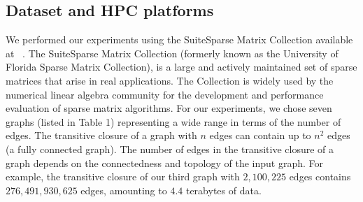 \subsection{Dataset and HPC platforms}
\label{sec:datasets}
We performed our experiments using the SuiteSparse Matrix Collection available at ~\cite{Davis:2011:UFS:2049662.2049663}.
The SuiteSparse Matrix Collection (formerly known as the University of Florida Sparse Matrix Collection), is a large and actively maintained set of sparse matrices that arise in real applications. The Collection is widely used by the numerical linear algebra community for the development and performance evaluation of sparse matrix algorithms. 
For our experiments, we chose seven graphs (listed in Table 1) representing a wide range in terms of the number of edges.
The transitive closure of a graph with $n$ edges can contain up to $n^2$ edges (a fully connected graph). The number of edges in the transitive closure of a graph depends on the connectedness and topology of the input graph. For example, the transitive closure of our third graph with $2,\!100,\!225$ edges contains $276,\!491,\!930,\!625$ edges, amounting to $4.4$ terabytes of data.


